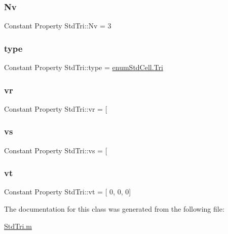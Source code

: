 \subsubsection{\texorpdfstring{Nv}{Nv}}
{\footnotesize\ttfamily Constant Property Std\+Tri\+::\+Nv = 3}

\mbox{\label{class_std_tri_ac93d8dc3c7bd803c9875c47d2c590da7}} 
\subsubsection{\texorpdfstring{type}{type}}
{\footnotesize\ttfamily Constant Property Std\+Tri\+::type = \hyperlink{classenum_std_cell_ac4c2fa4e189e76e103f3ff9b1d19b9e7aab74b152bf112943fbdb2b523d4e64fc}{enum\+Std\+Cell.\+Tri}}

\mbox{\label{class_std_tri_a3c1d1964951c35a6382d3c68cdb6f232}} 
\subsubsection{\texorpdfstring{vr}{vr}}
{\footnotesize\ttfamily Constant Property Std\+Tri\+::vr = \mbox{[}}

\mbox{\label{class_std_tri_ab3e529c532c5c3d811348eb178683c39}} 
\subsubsection{\texorpdfstring{vs}{vs}}
{\footnotesize\ttfamily Constant Property Std\+Tri\+::vs = \mbox{[}}

\mbox{\label{class_std_tri_ad1102edfb9e6cdb68dcbd3228ece1c68}} 
\subsubsection{\texorpdfstring{vt}{vt}}
{\footnotesize\ttfamily Constant Property Std\+Tri\+::vt = \mbox{[} 0, 0, 0\mbox{]}\textquotesingle{}}



The documentation for this class was generated from the following file\+:\begin{DoxyCompactItemize}
\item 
\hyperlink{_std_tri_8m}{Std\+Tri.\+m}\end{DoxyCompactItemize}
